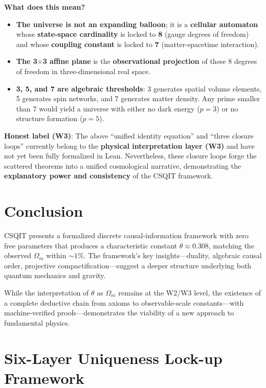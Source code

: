 \documentclass[aps,prd,twocolumn,nofootinbib,floatfix]{revtex4-2}
\begin{document}
\textbf{What does this mean?}
\begin{itemize}
    \item \textbf{The universe is not an expanding balloon}; it is a \textbf{cellular automaton} whose \textbf{state-space cardinality} is locked to \textbf{8} (gauge degrees of freedom) and whose \textbf{coupling constant} is locked to \textbf{7} (matter-spacetime interaction).
    \item \textbf{The 3$\times$3 affine plane} is the \textbf{observational projection} of these 8 degrees of freedom in three-dimensional real space.
    \item \textbf{3, 5, and 7 are algebraic thresholds}: 3 generates spatial volume elements, 5 generates spin networks, and 7 generates matter density. Any prime smaller than 7 would yield a universe with either no dark energy ($p=3$) or no structure formation ($p=5$).
\end{itemize}

\medskip

\noindent\textbf{Honest label (W3)}: The above ``unified identity equation'' and ``three closure loops'' currently belong to the \textbf{physical interpretation layer (W3)} and have not yet been fully formalized in Lean. Nevertheless, these closure loops forge the scattered theorems into a unified cosmological narrative, demonstrating the \textbf{explanatory power and consistency} of the CSQIT framework.

\section{Conclusion}

CSQIT presents a formalized discrete causal-information framework with zero free parameters that produces a characteristic constant $\theta \approx 0.308$, matching the observed $\Omega_m$ within $\sim 1\%$. The framework's key insights---duality, algebraic causal order, projective compactification---suggest a deeper structure underlying both quantum mechanics and gravity.

While the interpretation of $\theta$ as $\Omega_m$ remains at the W2/W3 level, the existence of a complete deductive chain from axioms to observable-scale constants---with machine-verified proofs---demonstrates the viability of a new approach to fundamental physics.

\appendix

\section{Six-Layer Uniqueness Lock-up Framework}
\end{document}
